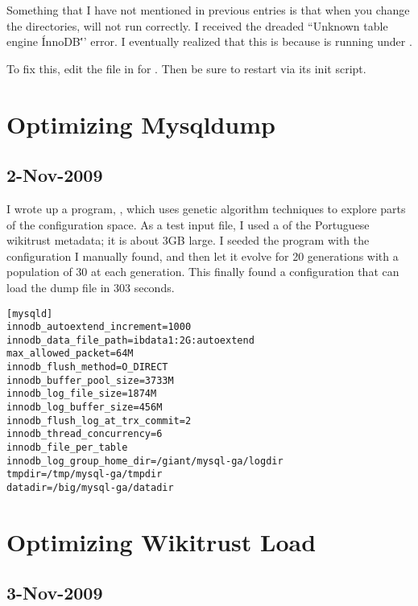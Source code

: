 Something that I have not mentioned in previous entries is that
when you change the directories, \mysql will not run correctly.
I received the dreaded ``Unknown table engine \'InnoDB\''' error.
I eventually realized that this is because \mysql is running under
.

To fix this, edit the file in  for .
Then be sure to restart  via its init script.

\section{Optimizing Mysqldump}

\subsection{2-Nov-2009}

I wrote up a program, , which uses genetic algorithm
techniques to explore parts of the configuration space.
As a test input file, I used a  of the Portuguese wikitrust
metadata; it is about 3GB large.
I seeded the program with the configuration I manually found,
and then let it evolve for 20 generations with a population of 30
at each generation.
This finally found a configuration that can load the dump file
in 303 seconds.

\begin{verbatim}
[mysqld]
innodb_autoextend_increment=1000
innodb_data_file_path=ibdata1:2G:autoextend
max_allowed_packet=64M
innodb_flush_method=O_DIRECT
innodb_buffer_pool_size=3733M
innodb_log_file_size=1874M
innodb_log_buffer_size=456M
innodb_flush_log_at_trx_commit=2
innodb_thread_concurrency=6
innodb_file_per_table
innodb_log_group_home_dir=/giant/mysql-ga/logdir
tmpdir=/tmp/mysql-ga/tmpdir
datadir=/big/mysql-ga/datadir
\end{verbatim}

\section{Optimizing Wikitrust Load}

\subsection{3-Nov-2009}


